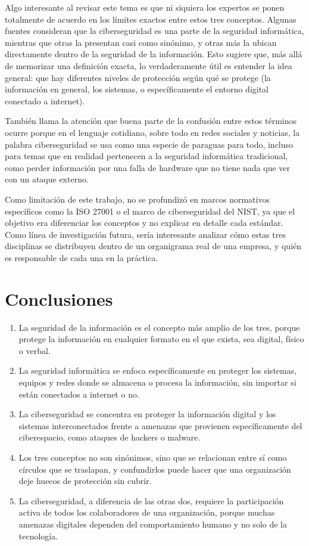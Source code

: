 \documentclass[12pt,letterpaper]{article}
\begin{document}
Algo interesante al revisar este tema es que ni siquiera los expertos se ponen totalmente de acuerdo en los límites exactos entre estos tres conceptos. Algunas fuentes consideran que la ciberseguridad es una parte de la seguridad informática, mientras que otras la presentan casi como sinónimo, y otras más la ubican directamente dentro de la seguridad de la información. Esto sugiere que, más allá de memorizar una definición exacta, lo verdaderamente útil es entender la idea general: que hay diferentes niveles de protección según qué se protege (la información en general, los sistemas, o específicamente el entorno digital conectado a internet).

También llama la atención que buena parte de la confusión entre estos términos ocurre porque en el lenguaje cotidiano, sobre todo en redes sociales y noticias, la palabra ciberseguridad se usa como una especie de paraguas para todo, incluso para temas que en realidad pertenecen a la seguridad informática tradicional, como perder información por una falla de hardware que no tiene nada que ver con un ataque externo.

Como limitación de este trabajo, no se profundizó en marcos normativos específicos como la ISO 27001 o el marco de ciberseguridad del NIST, ya que el objetivo era diferenciar los conceptos y no explicar en detalle cada estándar. Como línea de investigación futura, sería interesante analizar cómo estas tres disciplinas se distribuyen dentro de un organigrama real de una empresa, y quién es responsable de cada una en la práctica.

\section*{Conclusiones}

\begin{enumerate}[label=\arabic*., leftmargin=*]
\item La seguridad de la información es el concepto más amplio de los tres, porque protege la información en cualquier formato en el que exista, sea digital, físico o verbal.
\item La seguridad informática se enfoca específicamente en proteger los sistemas, equipos y redes donde se almacena o procesa la información, sin importar si están conectados a internet o no.
\item La ciberseguridad se concentra en proteger la información digital y los sistemas interconectados frente a amenazas que provienen específicamente del ciberespacio, como ataques de hackers o malware.
\item Los tres conceptos no son sinónimos, sino que se relacionan entre sí como círculos que se traslapan, y confundirlos puede hacer que una organización deje huecos de protección sin cubrir.
\item La ciberseguridad, a diferencia de las otras dos, requiere la participación activa de todos los colaboradores de una organización, porque muchas amenazas digitales dependen del comportamiento humano y no solo de la tecnología.
\end{enumerate}
\end{document}
